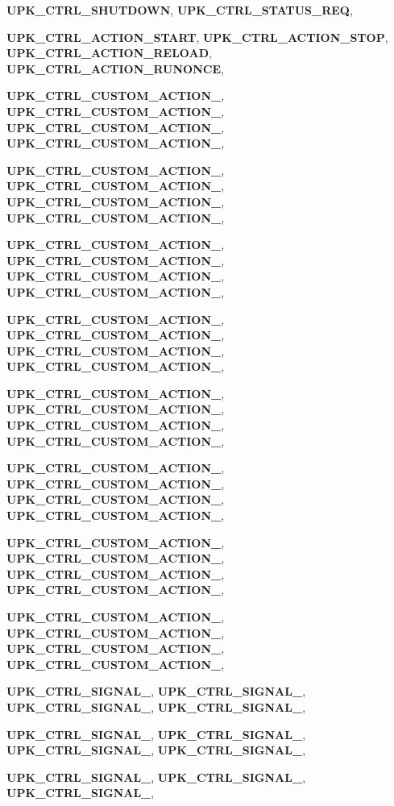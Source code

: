 \begin{DoxyCompactItemize}
{\bf UPK\_\-CTRL\_\-SHUTDOWN}, 
{\bf UPK\_\-CTRL\_\-STATUS\_\-REQ}, 
\par
{\bf UPK\_\-CTRL\_\-ACTION\_\-START}, 
{\bf UPK\_\-CTRL\_\-ACTION\_\-STOP}, 
{\bf UPK\_\-CTRL\_\-ACTION\_\-RELOAD}, 
{\bf UPK\_\-CTRL\_\-ACTION\_\-RUNONCE}, 
\par
{\bf UPK\_\-CTRL\_\-CUSTOM\_\-ACTION\_}, 
{\bf UPK\_\-CTRL\_\-CUSTOM\_\-ACTION\_}, 
{\bf UPK\_\-CTRL\_\-CUSTOM\_\-ACTION\_}, 
{\bf UPK\_\-CTRL\_\-CUSTOM\_\-ACTION\_}, 
\par
{\bf UPK\_\-CTRL\_\-CUSTOM\_\-ACTION\_}, 
{\bf UPK\_\-CTRL\_\-CUSTOM\_\-ACTION\_}, 
{\bf UPK\_\-CTRL\_\-CUSTOM\_\-ACTION\_}, 
{\bf UPK\_\-CTRL\_\-CUSTOM\_\-ACTION\_}, 
\par
{\bf UPK\_\-CTRL\_\-CUSTOM\_\-ACTION\_}, 
{\bf UPK\_\-CTRL\_\-CUSTOM\_\-ACTION\_}, 
{\bf UPK\_\-CTRL\_\-CUSTOM\_\-ACTION\_}, 
{\bf UPK\_\-CTRL\_\-CUSTOM\_\-ACTION\_}, 
\par
{\bf UPK\_\-CTRL\_\-CUSTOM\_\-ACTION\_}, 
{\bf UPK\_\-CTRL\_\-CUSTOM\_\-ACTION\_}, 
{\bf UPK\_\-CTRL\_\-CUSTOM\_\-ACTION\_}, 
{\bf UPK\_\-CTRL\_\-CUSTOM\_\-ACTION\_}, 
\par
{\bf UPK\_\-CTRL\_\-CUSTOM\_\-ACTION\_}, 
{\bf UPK\_\-CTRL\_\-CUSTOM\_\-ACTION\_}, 
{\bf UPK\_\-CTRL\_\-CUSTOM\_\-ACTION\_}, 
{\bf UPK\_\-CTRL\_\-CUSTOM\_\-ACTION\_}, 
\par
{\bf UPK\_\-CTRL\_\-CUSTOM\_\-ACTION\_}, 
{\bf UPK\_\-CTRL\_\-CUSTOM\_\-ACTION\_}, 
{\bf UPK\_\-CTRL\_\-CUSTOM\_\-ACTION\_}, 
{\bf UPK\_\-CTRL\_\-CUSTOM\_\-ACTION\_}, 
\par
{\bf UPK\_\-CTRL\_\-CUSTOM\_\-ACTION\_}, 
{\bf UPK\_\-CTRL\_\-CUSTOM\_\-ACTION\_}, 
{\bf UPK\_\-CTRL\_\-CUSTOM\_\-ACTION\_}, 
{\bf UPK\_\-CTRL\_\-CUSTOM\_\-ACTION\_}, 
\par
{\bf UPK\_\-CTRL\_\-CUSTOM\_\-ACTION\_}, 
{\bf UPK\_\-CTRL\_\-CUSTOM\_\-ACTION\_}, 
{\bf UPK\_\-CTRL\_\-CUSTOM\_\-ACTION\_}, 
{\bf UPK\_\-CTRL\_\-CUSTOM\_\-ACTION\_}, 
\par
{\bf UPK\_\-CTRL\_\-SIGNAL\_}, 
{\bf UPK\_\-CTRL\_\-SIGNAL\_}, 
{\bf UPK\_\-CTRL\_\-SIGNAL\_}, 
{\bf UPK\_\-CTRL\_\-SIGNAL\_}, 
\par
{\bf UPK\_\-CTRL\_\-SIGNAL\_}, 
{\bf UPK\_\-CTRL\_\-SIGNAL\_}, 
{\bf UPK\_\-CTRL\_\-SIGNAL\_}, 
{\bf UPK\_\-CTRL\_\-SIGNAL\_}, 
\par
{\bf UPK\_\-CTRL\_\-SIGNAL\_}, 
{\bf UPK\_\-CTRL\_\-SIGNAL\_}, 
{\bf UPK\_\-CTRL\_\-SIGNAL\_}, 

\end{DoxyCompactItemize}
